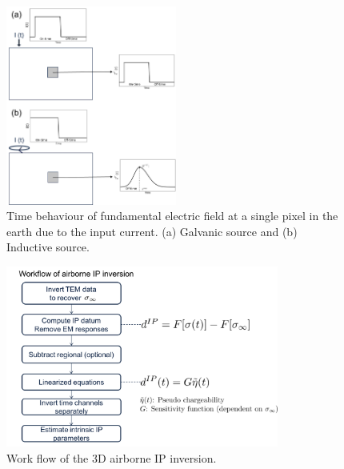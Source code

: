 \documentclass[letterpaper,11pt]{article}
\begin{document}
\begin{figure}[htb]
  \centering
  \includegraphics[width=0.5\textwidth]{figures/singlpixelE.png}
  \caption{Time behaviour of fundamental electric field at a single pixel in the earth due to the input current. (a) Galvanic source and (b) Inductive source. }
  \label{Fig:singlpixelE}
\end{figure}

\begin{figure}[htb]
  \centering
  \includegraphics[width=0.8\textwidth]{figures/workflow.png}
  \caption{Work flow of the 3D airborne IP inversion. }
  \label{Fig:workflow}
\end{figure}
\clearpage
\end{document}
